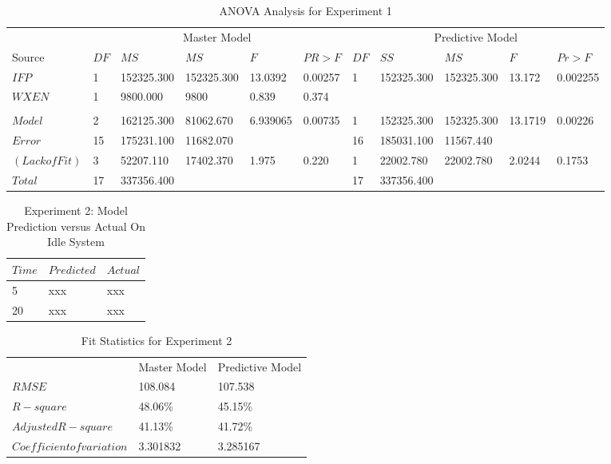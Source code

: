\documentclass[times, 10pt,onecolumn]{article}
\begin{document}
\begin{table}
  \centering
  \begin{tabular}{llllll|lllll}
    \multicolumn{1}{c}{} & \multicolumn{5}{c|}{Master Model}&\multicolumn{5}{c}{Predictive Model} \\
    Source&$DF$&$MS$&$MS$&$F$&$PR>F$&$DF$&$SS$&$MS$&$F$&$Pr>F$ \\
    \hline
    $IFP$&1&152325.300&152325.300 &13.0392&0.00257&1&152325.300&152325.300&13.172&0.002255 \\
    $WXEN$&1&9800.000&9800&0.839&0.374&&&&& \\
    &&&&&&&&&& \\
    $Model$&2&162125.300&81062.670&6.939065&0.00735&1&152325.300&152325.300&13.1719&0.00226\\
    $Error$&15&175231.100&11682.070&&&16&185031.100&11567.440&&\\
    $(Lack of Fit)$&3&52207.110&17402.370&1.975&0.220&1&22002.780&22002.780&2.0244&0.1753\\
    $Total$&17&337356.400& & & &17&337356.400&&& \\
  \end{tabular}
  \caption{ANOVA Analysis for Experiment 1}
  \label{tab:exp1anova}
\end{table}

\begin{table}
  \centering
  \begin{tabular}{l|l||l}
    $Time$&$Predicted$&$Actual$\\
    \hline
    5 & xxx & xxx\\
    20& xxx & xxx\\
  \end{tabular}
  \caption{Experiment 2: Model Prediction versus Actual On Idle System}
  \label{tab:exp2design}
\end{table}

\begin{table}
  \centering
  \begin{tabular}{l|ll}
    &Master Model&Predictive Model \\
    $RMSE$&108.084&107.538\\
    $R-square$&48.06\%&45.15\% \\
    $Adjusted R-square$&41.13\%&41.72\% \\
    $Coefficient of variation$&3.301832&3.285167 \\
  \end{tabular}
  \caption{Fit Statistics for Experiment 2}
  \label{tab:exp2fit}
\end{table}
\end{document}
